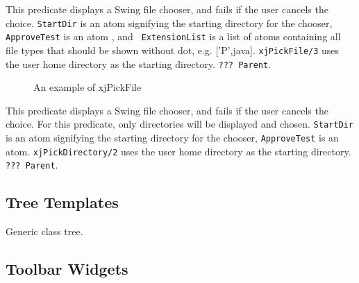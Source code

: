 \begin{description}

%
%
%
This predicate displays a Swing file chooser, and fails if the user
cancels the choice.  {\tt StartDir} is an atom signifying the starting
directory for the chooser, {\tt ApproveTest} is an atom , and {\tt
ExtensionList} is a list of atoms containing all file types that
should be shown without dot, e.g.  ['P',java].  {\tt xjPickFile/3}
uses the user home directory as the starting directory. {\tt ???
Parent}.

\begin{figure}[htbp] \label{fig:xjPickFile}
\caption{An example of xjPickFile}
\end{figure}

%
This predicate displays a Swing file chooser, and fails if the user
cancels the choice.  For this predicate, only directories will be
displayed and chosen.  {\tt StartDir} is an atom signifying the
starting directory for the chooser, {\tt ApproveTest} is an atom.
{\tt xjPickDirectory/2} uses the user home directory as the starting
directory. {\tt ???  Parent}.





\end{description}

\subsection{Tree Templates}
	Generic class tree.

\subsection{Toolbar Widgets}

